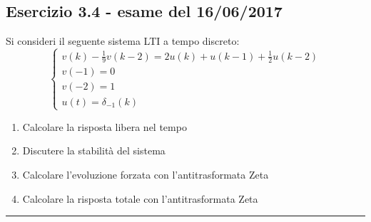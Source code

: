 \documentclass[12pt,a4paper]{article}
\begin{document}
		\subsection*{Esercizio 3.4 - esame del 16/06/2017} Si consideri il seguente sistema LTI a tempo discreto:
		\[
			\begin{cases}
			v(k) - \frac{1}{9}v(k-2) = 2u(k) + u(k-1) + \frac{1}{2}u(k-2)\\
			v(-1) = 0\\
			v(-2) = 1\\
			u(t) = \delta_{-1}(k)
			\end{cases}
		\]
		\begin{enumerate}
			\item Calcolare la risposta libera nel tempo
			\item Discutere la stabilit\`a del sistema
			\item Calcolare l'evoluzione forzata con l'antitrasformata Zeta
			\item Calcolare la risposta totale con l'antitrasformata Zeta
		\end{enumerate}
		\par\noindent\rule{\textwidth}{0.4pt}
\end{document}
